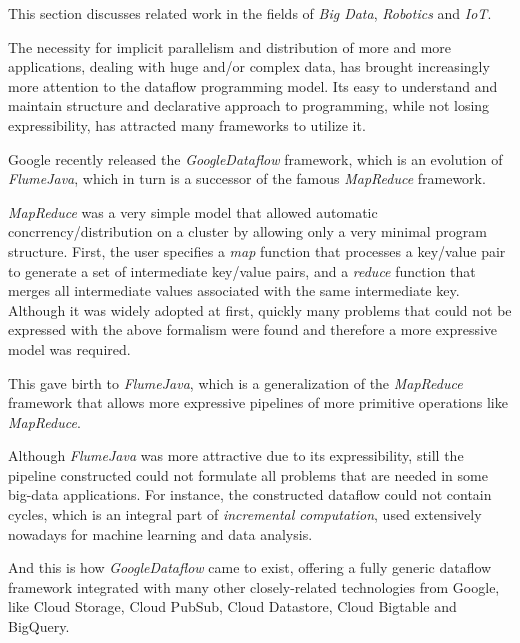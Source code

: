 \documentclass{dithesis}
\begin{document}
This section discusses related work in the fields of \textit{Big Data}, \textit{Robotics} and \textit{IoT}.


The necessity for implicit parallelism and distribution of more and more applications, dealing with huge and/or complex data, has brought increasingly more attention to the dataflow programming model. Its easy to understand and maintain structure and declarative approach to programming, while not losing expressibility, has attracted many frameworks to utilize it.


Google recently released the \textit{GoogleDataflow }framework, which is an evolution of \textit{FlumeJava}\cite{flumejava}, which in turn is a successor of the famous \textit{MapReduce }framework\cite{mapreduce}.

\textit{MapReduce} was a very simple model that allowed automatic concrrency/distribution on a cluster by allowing only a very minimal program structure. First, the user specifies a \textit{map} function that processes a key/value pair to generate a set of intermediate key/value pairs, and a \textit{reduce} function that merges all intermediate values associated with the same intermediate key. Although it was widely adopted at first, quickly many problems that could not be expressed with the above formalism were found and therefore a more expressive model was required.

This gave birth to \textit{FlumeJava}, which is a generalization of the \textit{MapReduce} framework that allows more expressive pipelines of more primitive operations like \textit{MapReduce}.

Although \textit{FlumeJava} was more attractive due to its expressibility, still the pipeline constructed could not formulate all problems that are needed in some big-data applications. For instance, the constructed dataflow could not contain cycles, which is an integral part of \textit{incremental computation}, used extensively nowadays for machine learning and data analysis.

And this is how \textit{GoogleDataflow} came to exist, offering a fully generic dataflow framework integrated with many other closely-related technologies from Google, like Cloud Storage, Cloud PubSub, Cloud Datastore, Cloud Bigtable and BigQuery. 
\end{document}
